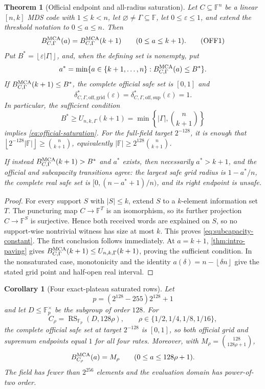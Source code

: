 \documentclass[11pt,a4paper]{amsart}
\numberwithin{equation}{section}
\newtheorem{theorem}{Theorem}[section]
\newtheorem{corollary}[corollary]{Corollary}
\theoremstyle{remark}
\DeclareMathOperator{\RS}{RS}
\newcommand{\F}{\mathbb F}
\newcommand{\eps}{\varepsilon}
\newcommand{\abs}[1]{\lvert #1\rvert}
\newcommand{\floor}[1]{\left\lfloor #1\right\rfloor}
\begin{document}
\begin{theorem}[Official endpoint and all-radius saturation]
\label{thm:official-saturation}
Let \(C\subseteq\F^n\) be a linear \([n,k]\) MDS code with \(1\le k<n\), let
\(\varnothing\ne\Gamma\subseteq\F\), let \(0\le\eps\le1\), and extend the
threshold notation to \(0\le a\le n\).  Then
\[
 B_{C,\Gamma}^{\rm MCA}(a)=B_{C,\Gamma}^{\rm MCA}(k+1)
 \qquad(0\le a\le k+1).                           \tag{OFF1}
 \label{eq:subcapacity-constant}
\]
Put \(B^*=\floor{\eps\abs\Gamma}\), and, when the defining set is
nonempty, put
\[
 a^*=\min\{a\in\{k+1,\ldots,n\}:
               B_{C,\Gamma}^{\rm MCA}(a)\le B^*\}.
\]
If
\(B_{C,\Gamma}^{\rm MCA}(k+1)\le B^*\), the complete official safe set is
\([0,1]\) and
\[
 \delta_{C,\Gamma,\mathrm{off,grid}}^*(\eps)
 =\delta_{C,\Gamma,\mathrm{off,sup}}^*(\eps)=1.   \tag{OFF2}
 \label{eq:official-saturation}
\]
In particular, the sufficient condition
\[
 B^*\ge U_{n,k,\Gamma}(k+1)
     =\min\left\{\abs\Gamma,\binom n{k+1}\right\} \tag{OFF3}
 \label{eq:official-saturation-budget}
\]
implies \eqref{eq:official-saturation}.  For the full-field target
\(2^{-128}\), it is enough that
\(\floor{2^{-128}\abs\F}\ge\binom n{k+1}\), equivalently
\(\abs\F\ge 2^{128}\binom n{k+1}\).

If instead \(B_{C,\Gamma}^{\rm MCA}(k+1)>B^*\) and \(a^*\) exists, then
necessarily \(a^*>k+1\), and the official and subcapacity transitions agree:
the largest safe grid radius is \(1-a^*/n\), the complete real safe set is
\([0,(n-a^*+1)/n)\), and its right endpoint is unsafe.
\end{theorem}

\begin{proof}
For every support \(S\) with \(\abs S\le k\), extend \(S\) to a
\(k\)-element information set \(T\).  The puncturing map
\(C\to\F^T\) is an isomorphism, so its further projection
\(C\to\F^S\) is surjective.  Hence both
received words are explained on \(S\), so no support-wise nontrivial witness
has size at most \(k\).  This proves \eqref{eq:subcapacity-constant}.  The
first conclusion follows immediately.  At \(a=k+1\),
\cref{thm:intro-paving} gives
\(B_{C,\Gamma}^{\rm MCA}(k+1)\le
U_{n,k,\Gamma}(k+1)\), proving the sufficient condition.  In the
nonsaturated case, monotonicity and the identity
\(a(\delta)=n-\floor{\delta n}\) give the stated grid point and half-open
real interval.
\end{proof}

\begin{corollary}[Four exact-plateau saturated rows]
\label{cor:intro-four-saturated-rows}
Let
\[
 p=(2^{128}-255)2^{128}+1
\]
and let \(D\le\F_p^\times\) be the subgroup of order \(128\).  For
\[
 C_\rho=\RS_{\F_p}(D,128\rho),
 \qquad \rho\in\{1/2,1/4,1/8,1/16\},
\]
the complete official safe set at target \(2^{-128}\) is \([0,1]\), so
both official grid and supremum endpoints equal \(1\) for all four rates.
Moreover, with \(M_\rho=\binom{128}{128\rho+1}\),
\[
 B_{C_\rho}^{\rm MCA}(a)=M_\rho
 \qquad(0\le a\le128\rho+1).
\]
The field has fewer than \(2^{256}\) elements and the evaluation domain has
power-of-two order.
\end{corollary}
\end{document}
